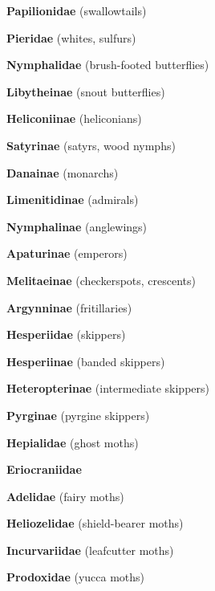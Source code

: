 \documentclass[letterpaper,10pt]{article}
\begin{document}
{\makebox[0.6cm]{}  \textbf{Papilionidae} (swallowtails) \par
\makebox[0.6cm]{}  \textbf{Pieridae} (whites, sulfurs) \par
\makebox[0.6cm]{}  \textbf{Nymphalidae} (brush-footed butterflies) \par
\makebox[0.8cm]{}  \textbf{Libytheinae} (snout butterflies) \par
\makebox[0.8cm]{}  \textbf{Heliconiinae} (heliconians) \par
\makebox[0.8cm]{}  \textbf{Satyrinae} (satyrs, wood nymphs) \par
\makebox[0.8cm]{}  \textbf{Danainae} (monarchs) \par
\makebox[0.8cm]{}  \textbf{Limenitidinae} (admirals) \par
\makebox[0.8cm]{}  \textbf{Nymphalinae} (anglewings) \par
\makebox[0.8cm]{}  \textbf{Apaturinae} (emperors) \par
\makebox[0.8cm]{}  \textbf{Melitaeinae} (checkerspots, crescents) \par
\makebox[0.8cm]{}  \textbf{Argynninae} (fritillaries) \par
\makebox[0.6cm]{}  \textbf{Hesperiidae} (skippers) \par
\makebox[0.8cm]{}  \textbf{Hesperiinae} (banded skippers) \par
\makebox[0.8cm]{}  \textbf{Heteropterinae} (intermediate skippers) \par
\makebox[0.8cm]{}  \textbf{Pyrginae} (pyrgine skippers) \par
\makebox[0.6cm]{}  \textbf{Hepialidae} (ghost moths) \par
\makebox[0.6cm]{}  \textbf{Eriocraniidae} \par
\makebox[0.6cm]{}  \textbf{Adelidae} (fairy moths) \par
\makebox[0.6cm]{}  \textbf{Heliozelidae} (shield-bearer moths) \par
\makebox[0.6cm]{}  \textbf{Incurvariidae} (leafcutter moths) \par
\makebox[0.6cm]{}  \textbf{Prodoxidae} (yucca moths) \par
}
\end{document}
